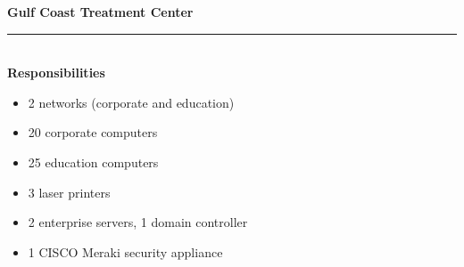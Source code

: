 \textbf{Gulf Coast Treatment Center}\vspace{2pt}\hrule\hfill\\
\textbf{Responsibilities}
\begin{itemize}[leftmargin=*]%
    \item 2 networks (corporate and education)
    \item 20 corporate computers
    \item 25 education computers
    \item 3 laser printers
    \item 2 enterprise servers, 1 domain controller
    \item 1 CISCO Meraki security appliance
\end{itemize}